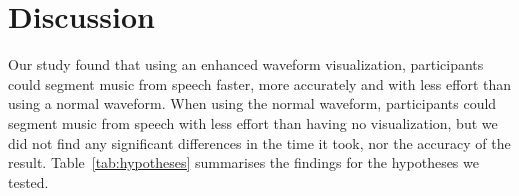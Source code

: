 





\section{Discussion}\label{sec:vis-discuss}

Our study found that using an enhanced waveform visualization, participants could segment music from speech faster,
more accurately and with less effort than using a normal waveform.  When using the normal waveform, participants could
segment music from speech with less effort than having no visualization, but we did not find any significant
differences in the time it took, nor the accuracy of the result.  Table~\ref{tab:hypotheses} summarises the findings
for the hypotheses we tested.


